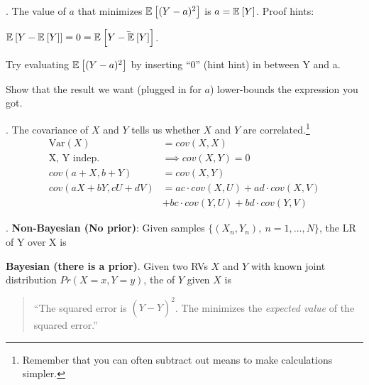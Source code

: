 \documentclass[12pt]{article}
\newcommand{\myspace}{\vspace{2\bigskipamount}}
\newcommand\p{\Needspace{12\baselineskip} \noindent}
\begin{document}
\myspace
\p {}. The value of $a$ that minimizes $\mathbb{E}_{}\left[(Y - a)^2\right]$ is $a = \mathbb{E}_{}\left[Y\right]$. Proof hints:
\begin{compactitem}
	\item $\mathbb{E}_{}\left[Y - \mathbb{E}_{}\left[Y\right]\right] = 0 = \mathbb{E}_{}\left[\bar{Y - \mathbb{E}_{}\left[Y\right]}\right]$. 
	\item Try evaluating $\mathbb{E}_{}\left[(Y - a)^2\right]$ by inserting ``0'' (hint hint) in between Y and a. 
	\item Show that the result we want (plugged in for $a$) lower-bounds the expression you got.
\end{compactitem}

\myspace
\newcommand\Var[1]{\text{Var}\left(#1 \right)}
\p {}. The covariance of $X$ and $Y$ tells us whether $X$ and $Y$ are correlated.\footnote{Remember that you can often subtract out means to make calculations simpler.}
\begin{align}
	\Var{X} &= cov(X, X) \\
	\text{X, Y indep.} &\implies cov(X, Y) = 0 \\
	cov(a + X, b + Y) &= cov(X, Y) \\
	cov(aX + bY, cU + dV) &= ac \cdot cov(X, U) + ad \cdot cov(X, V) \\
	&+ bc \cdot cov(Y, U) + bd \cdot cov(Y, V)
\end{align}


\myspace\label{LR}
\p {}. \textbf{Non-Bayesian (No prior)}: Given samples $\{(X_n, Y_n), ~ n = 1, \ldots, N\}$, the LR of Y over X is
	
\myspace
\textbf{Bayesian (there is a prior)}. Given two RVs $X$ and $Y$ with known joint distribution $Pr(X = x, Y = y)$, the  of $Y$ given $X$ is 
\begin{quote}
	\centering
	``The squared error is $(Y - \hat Y)^2$. The  minimizes the \textit{expected value} of the squared error.''
\end{quote}
\end{document}
